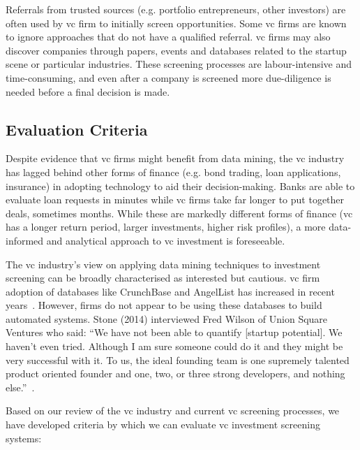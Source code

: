 \documentclass[../thesis/thesis.tex]{subfiles}
\begin{document}
Referrals from trusted sources (e.g. portfolio entrepreneurs, other investors) are often used by \gls{vc} firm to initially screen opportunities. Some \gls{vc} firms are known to ignore approaches that do not have a qualified referral. \Gls{vc} firms may also discover companies through papers, events and databases related to the startup scene or particular industries. These screening processes are labour-intensive and time-consuming, and even after a company is screened more due-diligence is needed before a final decision is made.

\subsection{Evaluation Criteria}

Despite evidence that \gls{vc} firms might benefit from data mining, the \gls{vc} industry has lagged behind other forms of finance (e.g. bond trading, loan applications, insurance) in adopting technology to aid their decision-making. Banks are able to evaluate loan requests in minutes while \gls{vc} firms take far longer to put together deals, sometimes months. While these are markedly different forms of finance (\gls{vc} has a longer return period, larger investments, higher risk profiles), a more data-informed and analytical approach to \gls{vc} investment is foreseeable.

The \gls{vc} industry's view on applying data mining techniques to investment screening can be broadly characterised as interested but cautious. \Gls{vc} firm adoption of databases like CrunchBase and AngelList has increased in recent years~\cite{patil2015}. However, firms do not appear to be using these databases to build automated systems. Stone (2014) interviewed Fred Wilson of Union Square Ventures who said: ``We have not been able to quantify [startup potential]. We haven't even tried. Although I am sure someone could do it and they might be very successful with it. To us, the ideal founding team is one supremely talented product oriented founder and one, two, or three strong developers, and nothing else.''~\cite{stone2014}.

Based on our review of the \gls{vc} industry and current \gls{vc} screening processes, we have developed criteria by which we can evaluate \gls{vc} investment screening systems:
\end{document}
